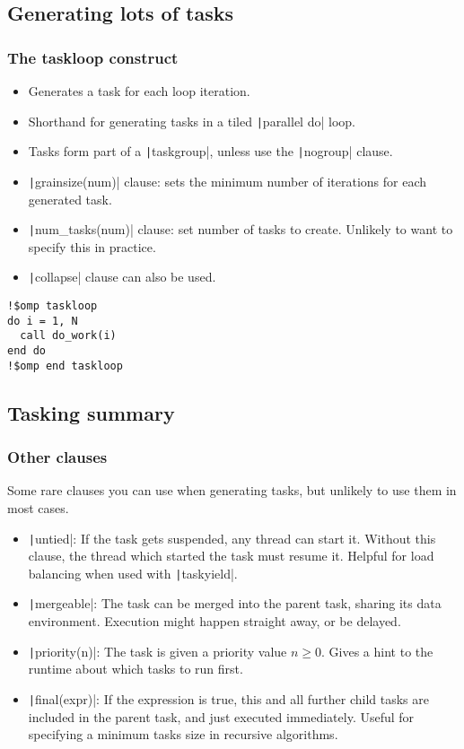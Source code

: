 \documentclass{beamer}
\begin{document}
\subsection{Generating lots of tasks}
\begin{frame}[fragile]
\frametitle{The taskloop construct}

\begin{itemize}
  \item Generates a task for each loop iteration.
  \item Shorthand for generating tasks in a tiled \texttt|parallel do| loop.
  \item Tasks form part of a \texttt|taskgroup|, unless use the \texttt|nogroup| clause.
  \item \texttt|grainsize(num)| clause: sets the minimum number of iterations for each generated task.
  \item \texttt|num_tasks(num)| clause: set number of tasks to create. Unlikely to want to specify this in practice.
  \item \texttt|collapse| clause can also be used.
\end{itemize}

\begin{verbatim}
!$omp taskloop
do i = 1, N
  call do_work(i)
end do
!$omp end taskloop
\end{verbatim}

\end{frame}
\subsection{Tasking summary}
\begin{frame}
\frametitle{Other clauses}
Some rare clauses you can use when generating tasks, but unlikely to use them in most cases.
\begin{itemize}
  \item \texttt|untied|: If the task gets suspended, any thread can start it. Without this clause, the thread which started the task must resume it. Helpful for load balancing when used with \texttt|taskyield|.
  \item \texttt|mergeable|: The task can be merged into the parent task, sharing its data environment. Execution might happen straight away, or be delayed.
  \item \texttt|priority(n)|: The task is given a priority value $n \ge 0$. Gives a hint to the runtime about which tasks to run first.
  \item \texttt|final(expr)|: If the expression is true, this and all further child tasks are included in the parent task, and just executed immediately. Useful for specifying a minimum tasks size in recursive algorithms.
\end{itemize}
\end{frame}
\end{document}
